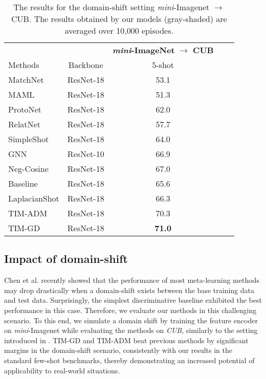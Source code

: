 \documentclass{article}
\begin{document}
        \begin{table}
            \newlength\wexp
            \centering
            \small
            \caption{The results for the domain-shift setting \textit{mini}-Imagenet $\rightarrow$ CUB. The results obtained by our models (gray-shaded) are averaged over 10,000 episodes.}
            \begin{tabular}{lcccc}
& & \multicolumn{1}{c}{\textbf{\textit{mini}-ImageNet} $\rightarrow$ \textbf{CUB}}\\
                 Methods & Backbone & 5-shot\\
                 \toprule
                 MatchNet \cite{matching_net} & ResNet-18 & 53.1\\
                 MAML \cite{maml} & ResNet-18 & 51.3 \\
                 ProtoNet \cite{prototypical_nets} & ResNet-18 & 62.0 \\
                 RelatNet \cite{relation_net} & ResNet-18 & 57.7 \\
SimpleShot \cite{simpleshot} & ResNet-18 & 64.0 \\
                GNN \cite{tseng2020cross} & ResNet-10 & 66.9 \\
                Neg-Cosine \cite{liu2020negative} & ResNet-18 & 67.0 \\
                Baseline \cite{closer_look} & ResNet-18 & 65.6 \\
                LaplacianShot \cite{Laplacian} & ResNet-18 & 66.3 \\
                \rowcolor{Gray} TIM-ADM & ResNet-18 & 70.3 \\
                \rowcolor{Gray} TIM-GD & ResNet-18 & \textbf{71.0} \\
                 \bottomrule
            \end{tabular}
            \label{tab:domin_shift_results}
        \end{table}
         
    \subsection{Impact of domain-shift}   
        Chen et al. \cite{closer_look} recently showed that the performance of most meta-learning methods may drop drastically when a domain-shift exists between the base training data and test data. Surprisingly, the simplest 
        discriminative baseline exhibited the best performance in this case. Therefore, we evaluate our methods in this challenging scenario. To this end, we simulate a domain shift by training the feature encoder on \textit{mini}-Imagenet while evaluating the methods on \textit{CUB}, similarly to the setting introduced in \cite{closer_look}. TIM-GD and TIM-ADM beat previous methods by significant margins in the domain-shift scenario, consistently with our results in the standard few-shot benchmarks, thereby demonstrating an increased potential of applicability to real-world situations.
\end{document}
